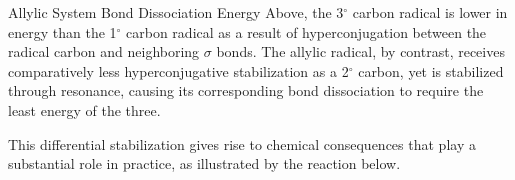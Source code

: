 \begin{core}{Allylic System Bond Dissociation Energy}
      Above, the 3$^\circ$ carbon radical is lower in energy than the 1$^\circ$ carbon radical as a result of hyperconjugation between the radical carbon and neighboring $\sigma$ bonds. The allylic radical, by contrast, receives comparatively less hyperconjugative stabilization as a 2$^\circ$ carbon, yet is stabilized through resonance, causing its corresponding bond dissociation to require the least energy of the three.


      This differential stabilization gives rise to chemical consequences that play a substantial role in practice, as illustrated by the reaction below.


\end{core}
